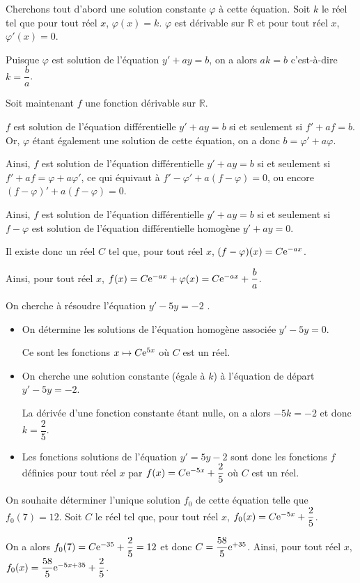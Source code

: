 \documentclass[11pt,fleqn, openany]{book} %
\begin{document}
\begin{demonstration} Cherchons tout d'abord une solution constante $\varphi$ à cette équation. Soit $k$ le réel tel que pour tout réel $x$, $\varphi (x)=k$. $\varphi$ est dérivable sur $\mathbb{R}$ et pour tout réel $x$, $\varphi '(x)=0$.

Puisque $\varphi$ est solution de l'équation $y'+ay=b$, on a alors $ak=b$ c'est-à-dire $k=\dfrac{b}{a}$.

Soit maintenant $f$ une fonction dérivable sur $\mathbb{R}$.

$f$ est solution de l'équation différentielle $y'+ay=b$ si et seulement si $f'+af=b$. Or, $\varphi$ étant également une solution de cette équation, on a donc $b=\varphi'+a\varphi$.

Ainsi, $f$ est solution de l'équation différentielle $y'+ay=b$ si et seulement si $f'+af=\varphi+a\varphi '$, ce qui équivaut à $f'-\varphi'+a(f-\varphi)=0$, ou encore $(f-\varphi)'+a(f-\varphi)=0$.

Ainsi, $f$ est solution de l'équation différentielle $y'+ay=b$ si et seulement si $f-\varphi$ est solution de l'équation différentielle homogène $y'+ay=0$.

Il existe donc un réel $C$ tel que, pour tout réel $x$, $(f-\varphi)(x)=C\mathrm{e}^{-ax}$.

 Ainsi, pour tout réel $x$, $f(x)=C\mathrm{e}^{-ax}+\varphi(x)=C\mathrm{e}^{-ax}+\dfrac{b}{a}$.

\end{demonstration}



\begin{example} On cherche à résoudre l'équation $y'-5y=-2$ .

\begin{itemize}
\item On détermine les solutions de l'équation homogène associée $y'-5y=0$. 

Ce sont les fonctions $x\mapsto C\mathrm{e}^{5x}$ où $C$ est un réel.
\item On cherche une solution constante (égale à $k$) à l'équation de départ $y'-5y=-2$. 

La dérivée d'une fonction constante étant nulle, on a alors $-5k=-2$ et donc $k=\dfrac{2}{5}$.

\item Les fonctions solutions de l'équation $y'=5y-2$ sont donc les fonctions $f$ définies pour tout réel $x$ par $f(x)=C\mathrm{e}^{-5x}+\dfrac{2}{5}$ où $C$ est un réel.
\end{itemize}

On souhaite déterminer l'unique solution $f_0$ de cette équation telle que $f_0(7)=12$. Soit $C$ le réel tel que, pour tout réel $x$, $f_0(x)=C\mathrm{e}^{-5x}+\dfrac{2}{5}$.

On a alors $f_0(7)=C\mathrm{e}^{-35}+\dfrac{2}{5}=12$ et donc $C=\dfrac{58}{5}\mathrm{e}^{+35}$. Ainsi, pour tout réel $x$, $f_0(x)=\dfrac{58}{5}\mathrm{e}^{-5x+35}+\dfrac{2}{5}$.\end{example}
\end{document}
